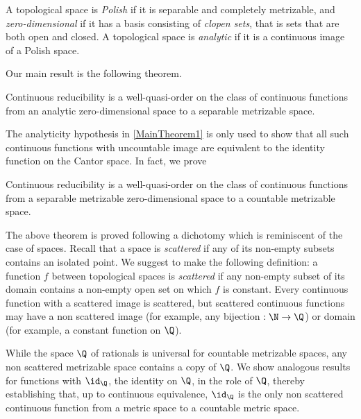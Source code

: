 A topological space is \emph{Polish} if it is separable and completely metrizable, and \emph{zero-dimensional} if it has a basis consisting of \emph{clopen sets},
that is sets that are both open and closed. A topological space is \emph{analytic} if it is a continuous image of a Polish space.

Our main result is the following theorem.

\begin{maintheorem}\label{MainTheorem1}
Continuous reducibility is a well-quasi-order on the class of continuous functions from an analytic zero-dimensional space to a separable metrizable space.
\end{maintheorem}

The analyticity hypothesis in \cref{MainTheorem1} is only used to show that all such continuous functions with uncountable image are equivalent to the identity function on the Cantor space. In fact, we prove

\begin{maintheorem}\label{MainTheorem2}
Continuous reducibility is a well-quasi-order on the class of continuous functions from a separable metrizable zero-dimensional space to a countable metrizable space.
\end{maintheorem}

The above theorem is proved following a dichotomy which is reminiscent of the case of spaces.
Recall that a space is \emph{scattered} if any of its non-empty subsets contains an isolated point. We suggest to make the following definition:
a function $f$ between topological spaces is \emph{scattered} if any non-empty subset of its domain contains a {non-empty} open set on which $f$ is constant.
Every continuous function with a scattered image is scattered, but scattered continuous functions may have a non scattered image (for example, any bijection $:\N\to\Q$) or domain (for example, a constant function on $\Q$).

While the space $\Q$ of rationals is universal for countable metrizable spaces, any non scattered metrizable space contains a copy of $\Q$.
We show analogous results for functions with $\id_\Q$, the identity on $\Q$, in the role of $\Q$, thereby establishing that, up to continuous equivalence,
$\id_\Q$ is the only non scattered continuous function from a metric space to a countable metric space. 


